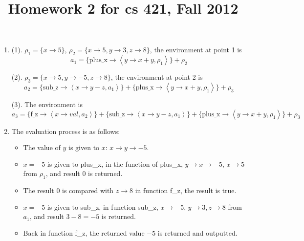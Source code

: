 \documentclass[journal,12pt,draftclsnofoot,onecolumn]{IEEEtran}
\title{Homework 2 for cs 421, Fall 2012}
\author{
\authorblockN{Ji Zhu, jizhu1}
}
\newcommand{\vect}[2]{
\left\langle#1,#2\right\rangle
}
\newcommand{\post}[2]{
\centering \leavevmode
 \texttt{[image: \#1]}
 }
\begin{document}
\maketitle

\begin{enumerate}
\item (1). $\rho_{1} = \{x\rightarrow 5\}$, $\rho_{2} = \{x\rightarrow 5, y\rightarrow 3, z\rightarrow 8\}$, the environment at point 1 is
$$
a_{1} = \{\text{plus\_x}\rightarrow \vect{y\rightarrow x+y}{ \rho_{1} }\} + \rho_{2}
$$

(2). $\rho_{3} = \{x\rightarrow 5, y\rightarrow -5, z\rightarrow 8\}$, the environment at point 2 is
$$
a_{2}=\{ \text{sub\_z}\rightarrow \vect{x\rightarrow y-z}{a_{1}} \}+
\{\text{plus\_x}\rightarrow \vect{y\rightarrow x+y}{ \rho_{1} }\} + \rho_{3}
$$

(3). The environment is
$$
a_{3} = \{\text{f\_z}\rightarrow \vect{x\rightarrow val}{a_{2}}\} +
\{ \text{sub\_z}\rightarrow \vect{x\rightarrow y-z}{a_{1}} \}+
\{\text{plus\_x}\rightarrow \vect{y\rightarrow x+y}{ \rho_{1} }\} + \rho_{3}
$$

\item The evaluation process is as follows:
\begin{itemize}
\item The value of $y$ is given to $x$: $x\rightarrow y\rightarrow -5$.
\item $x=-5$ is given to plus\_x, in the function of plus\_x, $y\rightarrow x\rightarrow -5$, $x\rightarrow 5$ from $\rho_{1}$, and result $0$ is returned.  
\item The result $0$ is compared with $z\rightarrow 8$ in function f\_z, the result is true.
\item $x = -5$ is given to sub\_z, in function sub\_z, $x\rightarrow -5$, $y\rightarrow 3, z\rightarrow 8$ from $a_{1}$, and result $3-8 = -5$ is returned. 
\item Back in function f\_z, the returned value $-5$ is returned and outputted.
\end{itemize}
\end{enumerate}






%
\end{document}
